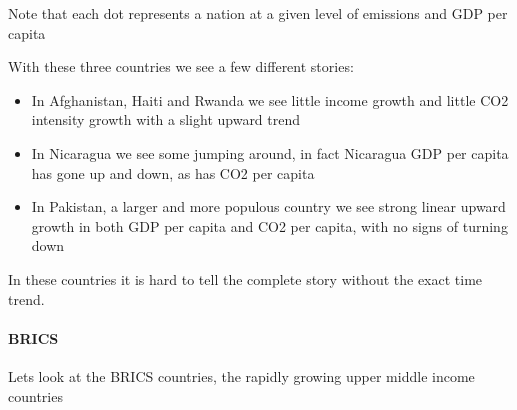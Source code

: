 \documentclass[letterpaper,10pt,english]{jupyterBook}
\begin{document}
\noindent{}

\sphinxAtStartPar
Note that each dot represents a nation at a given level of emissions and GDP per capita

\sphinxAtStartPar
With these three countries we see a few different stories:
\begin{itemize}
\item {} 
\sphinxAtStartPar
In Afghanistan, Haiti and Rwanda we see little income growth and little CO2 intensity growth with a slight upward trend

\item {} 
\sphinxAtStartPar
In Nicaragua we see some jumping around, in fact Nicaragua GDP per capita has gone up and down, as has CO2 per capita

\item {} 
\sphinxAtStartPar
In Pakistan, a larger and more populous country we see strong linear upward growth in both GDP per capita and CO2 per capita, with no signs of turning down

\end{itemize}

\sphinxAtStartPar
In these countries it is hard to tell the complete story without the exact time trend.


\paragraph{BRICS}
\label{\detokenize{content/12-environmental/KuznetsHypothesis-Copy1:brics}}
\sphinxAtStartPar
Lets look at the BRICS countries, the rapidly growing upper middle income countries
\end{document}
